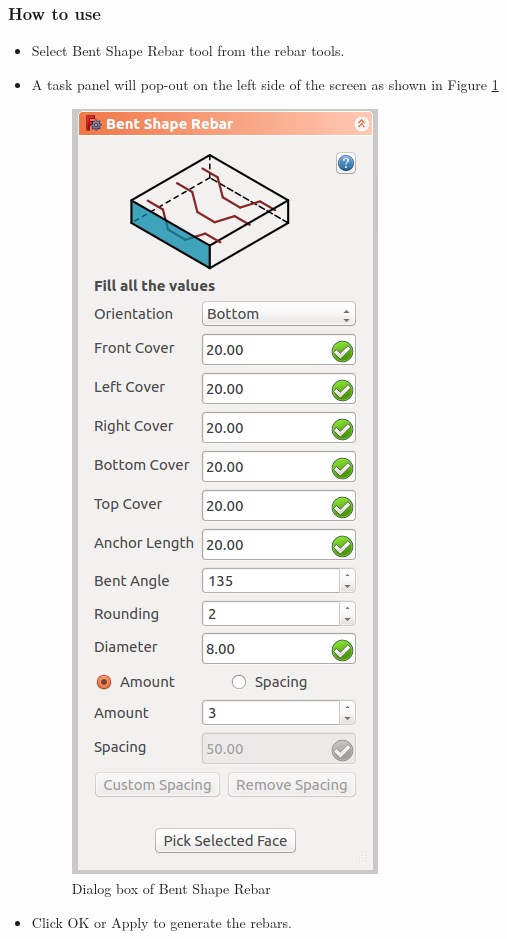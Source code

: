 \subsubsection{How to use}
\begin{itemize}
\item Select Bent Shape Rebar tool from the rebar tools.
\item A task panel will pop-out on the left side of the screen as shown in Figure \ref{bentshaperebardialog}
\begin{figure}
    \centering \includegraphics[scale=0.60]{images/BentShapeDialog.png}
    \caption{Dialog box of Bent Shape Rebar}
    \label{bentshaperebardialog}
\end{figure}
\item Click OK or Apply to generate the rebars.
\end{itemize}

